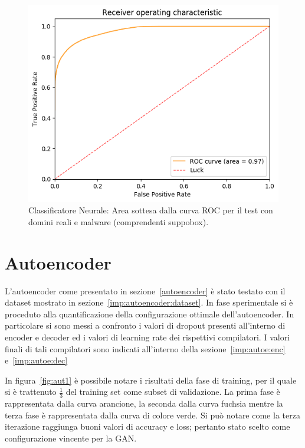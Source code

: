 \begin{figure}[!bp]
    \centering
    \includegraphics[width=\columnwidth]{figures/clas_nn/roc_plot.png}
    \caption{Classificatore Neurale: Area sottesa dalla curva ROC per il test con domini reali e malware (comprendenti suppobox).\label{fig:cnrocall}}
\end{figure}

\newpage
\section{Autoencoder}
\label{ris:autoenc}
L'autoencoder come presentato in sezione~\ref{autoencoder} è stato testato con il dataset mostrato in sezione~\ref{imp:autoencoder:dataset}. In fase sperimentale si è proceduto alla quantificazione della configurazione ottimale dell'autoencoder. In particolare si sono messi a confronto i valori di dropout presenti all'interno di encoder e decoder ed i valori di learning rate dei rispettivi compilatori. I valori finali di tali compilatori sono indicati all'interno della sezione~\ref{imp:autoe:enc} e~\ref{imp:autoe:dec}

In figura~\ref{fig:aut1} è possibile notare i risultati della fase di training, per il quale si è trattenuto $\frac{1}{3}$ del training set come subset di validazione.  La prima fase è rappresentata dalla curva arancione, la seconda dalla curva fuchsia mentre la terza fase è rappresentata dalla curva di colore verde. Si può notare come la terza iterazione raggiunga buoni valori di accuracy e loss; pertanto stato scelto come configurazione vincente per la GAN.

